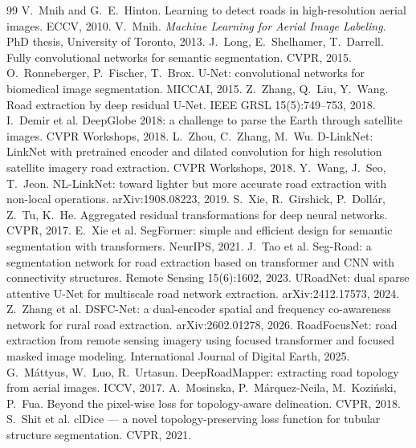\documentclass[11pt]{article}
\begin{document}
\begin{thebibliography}{99}\small
{} V.~Mnih and G.~E.~Hinton. Learning to detect roads in high-resolution aerial images. ECCV, 2010.
 V.~Mnih. \emph{Machine Learning for Aerial Image Labeling}. PhD thesis, University of Toronto, 2013.
 J.~Long, E.~Shelhamer, T.~Darrell. Fully convolutional networks for semantic segmentation. CVPR, 2015.
 O.~Ronneberger, P.~Fischer, T.~Brox. U-Net: convolutional networks for biomedical image segmentation. MICCAI, 2015.
 Z.~Zhang, Q.~Liu, Y.~Wang. Road extraction by deep residual U-Net. IEEE GRSL 15(5):749--753, 2018.
 I.~Demir et al. DeepGlobe 2018: a challenge to parse the Earth through satellite images. CVPR Workshops, 2018.
 L.~Zhou, C.~Zhang, M.~Wu. D-LinkNet: LinkNet with pretrained encoder and dilated convolution for high resolution satellite imagery road extraction. CVPR Workshops, 2018.
 Y.~Wang, J.~Seo, T.~Jeon. NL-LinkNet: toward lighter but more accurate road extraction with non-local operations. arXiv:1908.08223, 2019.
 S.~Xie, R.~Girshick, P.~Doll\'ar, Z.~Tu, K.~He. Aggregated residual transformations for deep neural networks. CVPR, 2017.
 E.~Xie et al. SegFormer: simple and efficient design for semantic segmentation with transformers. NeurIPS, 2021.
 J.~Tao et al. Seg-Road: a segmentation network for road extraction based on transformer and CNN with connectivity structures. Remote Sensing 15(6):1602, 2023.
 URoadNet: dual sparse attentive U-Net for multiscale road network extraction. arXiv:2412.17573, 2024.
 Z.~Zhang et al. DSFC-Net: a dual-encoder spatial and frequency co-awareness network for rural road extraction. arXiv:2602.01278, 2026.
 RoadFocusNet: road extraction from remote sensing imagery using focused transformer and focused masked image modeling. International Journal of Digital Earth, 2025.
 G.~M\'attyus, W.~Luo, R.~Urtasun. DeepRoadMapper: extracting road topology from aerial images. ICCV, 2017.
 A.~Mosinska, P.~M\'arquez-Neila, M.~Kozi\'nski, P.~Fua. Beyond the pixel-wise loss for topology-aware delineation. CVPR, 2018.
 S.~Shit et al. clDice --- a novel topology-preserving loss function for tubular structure segmentation. CVPR, 2021.

\end{thebibliography}
\end{document}
